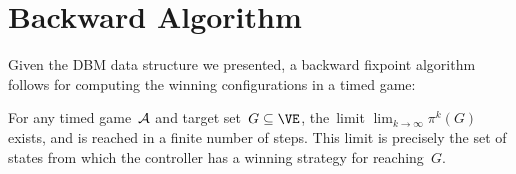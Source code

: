 \section{Backward Algorithm}
Given the DBM data structure we presented,
a backward fixpoint algorithm follows for computing the winning configurations in a timed game:

\begin{theorem}
   \label{10-thm:timed-control}
   For any timed game~$\mathcal{A}$ and target set~$G \subseteq \VE$, 
   the~limit $\lim_{k \rightarrow \infty} \pi^k(G)$ exists, and is reached 
   in a finite number of steps. This limit is precisely the set of states from
   which the controller has a winning strategy for reaching~$G$.
\end{theorem}

